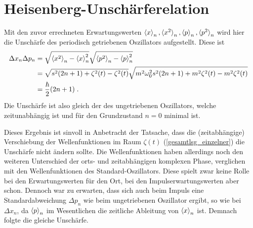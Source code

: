   \section{Heisenberg-Unschärferelation}
    Mit den zuvor errechneten Erwartungswerten $\braket{x}_n,\braket{x^2}_n,\braket{p}_n,\braket{p^2}_n$ wird hier die Unschärfe des periodisch getriebenen Oszillators aufgestellt.
    Diese ist
    \begin{align}
      \Delta x_n\Delta p_n &= \sqrt{\braket{x^2}_n-\braket{x}^2_n}\sqrt{\braket{p^2}_n-\braket{p}^2_n} \notag\\
      &= \sqrt{s^2(2n+1)+\zeta^2(t)-\zeta^2(t)}\sqrt{m^2\omega^2_0s^2(2n+1)+m^2\zeta^2(t)-m^2\zeta^2(t)} \notag\\
      &= \frac{\hbar}{2}(2n+1) \; .
    \end{align}
    Die Unschärfe ist also gleich der des ungetriebenen Oszillators, welche zeitunabhängig ist und für den Grundzustand $n=0$ minimal ist.

    Dieses Ergebnis ist sinvoll in Anbetracht der Tatsache, dass die (zeitabhängige) Verschiebung der Wellenfunktionen im Raum $\zeta(t)$ (\ref{gesamtlsg_einzelner}) die Unschärfe nicht ändern sollte.
    Die Wellenfunktionen haben allerdings noch den weiteren Unterschied der orts- und zeitabhängigen komplexen Phase, verglichen mit den Wellenfunktionen des Standard-Oszillators.
    Diese spielt zwar keine  Rolle bei den Erwartungswerten für den Ort, bei den Impulserwartungswerten aber schon.
    Dennoch war zu erwarten, dass sich auch beim Impuls eine Standardabweichung $\Delta p_n$ wie beim ungetriebenen Oszillator ergibt, so wie bei $\Delta x_n$, da $\braket{p}_n$ im Wesentlichen die zeitliche Ableitung von $\braket{x}_n$ ist.
    Demnach folgte die gleiche Unschärfe.


\iffalse
  \subsection{Erwartungswerte der Energie}
    Hier werden wir den normalen zeitabhängigen Erwartungswert der Energie $\braket{H(t)}_n$ aufstellen.
    Weiterhin wird der zeitlich, über eine Periode $T$, gemittelten Erwartungswert $\overline{H}_n$ mittels Formel (\ref{mittleres_H}) für eine beliebige Treibkraft bestimmt, indem wir die Quasienergien $\epsilon_n$ benutzen, welche wir in Kapitel \ref{espsilon_bel_kraft} für eine allgemeine periodische Treibkraft $S(t)$, in Abhängigkeit deren  Fourier-Koeffizienten, bestimmt haben.
\fi

